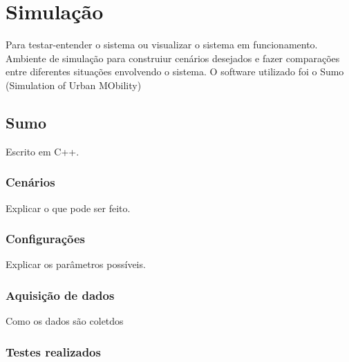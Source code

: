 \chapter{Simulação}

Para testar-entender o sistema ou visualizar o sistema em funcionamento.
Ambiente de simulação para construiur cenários desejados e fazer comparações entre diferentes situações envolvendo o sistema.
O software utilizado foi o Sumo (Simulation of Urban MObility)

\section{Sumo}
Escrito em C++.

\subsection{Cenários}

Explicar o que pode ser feito.

\subsection{Configurações}

Explicar os parâmetros possíveis.

\subsection{Aquisição de dados}

Como os dados são coletdos

\subsection{Testes realizados}

